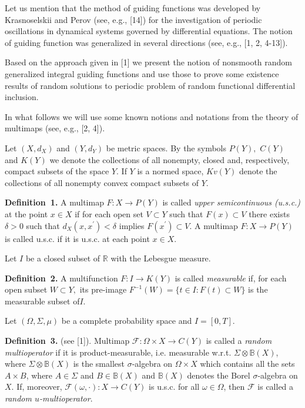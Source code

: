 \vzmscaption


Let us mention that the method of guiding functions was developed by Krasnoselskii and Perov (see, e.g., [14]) for the investigation of periodic oscillations in dynamical systems go\-ver\-ned by differential equations. The notion of guiding function was generalized in several directions (see, e.g., [1, 2, 4-13]).

Based on the approach given in [1] we present the notion of nonsmooth random generalized integral guiding functions and use those to prove some existence results of random solutions to periodic problem of random functional differential inclusion.

In what follows we will use some known notions and notati\-ons from the theory of multimaps (see, e.g., [2, 4]).

Let $(X,d_X)$ and $(Y,d_Y)$ be metric spaces. By the symbols $P(Y),$ $C(Y)$ and $K(Y)$ we denote the collections of all nonemp\-ty, closed and, respectively, compact subsets of the space $Y.$ If $Y$ is a normed space, $Kv(Y)$ denote the collections of all nonempty convex compact subsets of $Y.$

\textbf{Definition~1.}
A multimap $F:X \to P(Y)$ is called {\it upper semicontinuous (u.s.c.)} at the point $x\in X$ if for each open set $V \subset Y$ such that $F(x) \subset V$ there exists $\delta >0$ such that $d_X(x,x^\prime)<\delta$ implies $F(x^\prime)\subset V.$ A multimap $F:X \to P(Y)$ is called u.s.c. if it is u.s.c. at each point $x\in X.$

Let $I$ be a closed subset of $\mathbb{R}$ with the Lebesgue measure.

\textbf{Definition~2.}
A multifunction $F:I \to K(Y)$ is called {\it measurable} if, for each open subset $W \subset Y,$ its pre-image \linebreak
$F^{-1}(W)=\{t\in I:F(t)\subset W\}$ is the measurable subset of$I.$

Let $(\Omega,\Sigma,\mu)$ be a complete probability space and $I=[0,T]$.

\textbf{Definition~3.} (see [1]). Multimap $\mathcal{F}\colon\Omega\times X\to C(Y)$ is called a {\it random multioperator} if it is product-measurable, i.e. measurable w.r.t. $\Sigma\otimes\mathbb{B}(X)$, where $\Sigma\otimes\mathbb{B}(X)$ is the smallest
$\sigma$-algebra on $\Omega\times X$ which contains all the sets $A\times B$, where $A\in\Sigma$ and $B\in\mathbb{B}(X)$ and
$\mathbb{B}(X)$ denotes the Borel $\sigma$-algebra on $X$. If, moreover, $\mathcal{F}(\omega,\cdot)\colon X\to C(Y)$ is u.s.c. for all
$\omega\in\Omega$, then $\mathcal{F}$ is called a {\it random $u$-multioperator}.

